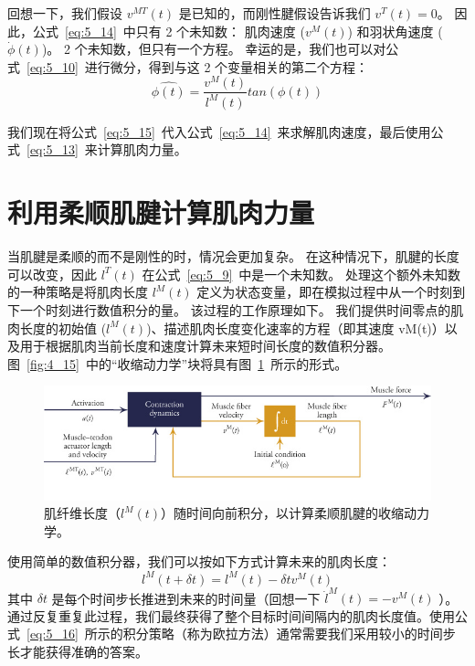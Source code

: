 回想一下，我们假设 $v^{MT}(t)$ 是已知的，而刚性腱假设告诉我们 $v^T(t) = 0$。
因此，公式~\ref{eq:5_14}~中只有 2 个未知数：
肌肉速度 ($v^M(t)$) 和羽状角速度 ($\dot{\phi} (t)$)。
2 个未知数，但只有一个方程。
幸运的是，我们也可以对公式~\ref{eq:5_10}~进行微分，得到与这 2 个变量相关的第二个方程：
%
\begin{equation}
	\hat{\phi (t)} = \frac{v^M (t)}{l^M (t)} tan(\phi (t))
	\label{eq:5_15}
\end{equation}


我们现在将公式~\ref{eq:5_15}~代入公式~\ref{eq:5_14}~来求解肌肉速度，最后使用公式~\ref{eq:5_13}~来计算肌肉力量。



\section{利用柔顺肌腱计算肌肉力量}

当肌腱是柔顺的而不是刚性的时，情况会更加复杂。
在这种情况下，肌腱的长度可以改变，因此 $l^T(t)$ 在公式~\ref{eq:5_9}~中是一个未知数。
处理这个额外未知数的一种策略是将肌肉长度 $l^M(t)$ 定义为状态变量，即在模拟过程中从一个时刻到下一个时刻进行数值积分的量。
该过程的工作原理如下。
我们提供时间零点的肌肉长度的初始值 ($l^M(t)$)、描述肌肉长度变化速率的方程（即其速度 vM(t)）以及用于根据肌肉当前长度和速度计算未来短时间长度的数值积分器。
图~\ref{fig:4_15}~中的“收缩动力学”块将具有图~\ref{fig:5_12}~所示的形式。


\begin{figure}[!htb]
	\centering
	\includegraphics[width=1.0\linewidth]{chap5/5_12}
	\caption{肌纤维长度（$l^M(t)$）随时间向前积分，以计算柔顺肌腱的收缩动力学。 \label{fig:5_12}}
\end{figure}


使用简单的数值积分器，我们可以按如下方式计算未来的肌肉长度：
%
\begin{equation}
	l^M (t + \delta t) = l^M (t) - \delta t v^M (t)
	\label{eq:5_16}
\end{equation}
%
其中 $\delta t$ 是每个时间步长推进到未来的时间量（回想一下 $\dot{l} ^M (t) = -v ^M (t)$ ）。
通过反复重复此过程，我们最终获得了整个目标时间间隔内的肌肉长度值。使用公式~\ref{eq:5_16}~所示的积分策略（称为欧拉方法）通常需要我们采用较小的时间步长才能获得准确的答案。



